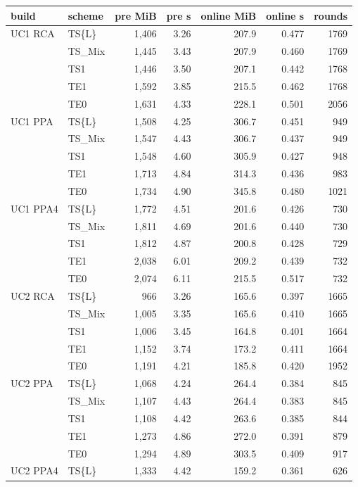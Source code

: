\begin{table}[t]
\centering\small
\begin{tabular}{@{}llrrrrr@{}}
\toprule
build & scheme & pre MiB & pre s & online MiB & online s & rounds\\
\midrule
UC1 RCA & TS\{L\} & 1{,}406 & 3.26 & 207.9 & 0.477 & 1769\\
 & TS\_Mix & 1{,}445 & 3.43 & 207.9 & 0.460 & 1769\\
 & TS1 & 1{,}446 & 3.50 & 207.1 & 0.442 & 1768\\
 & TE1 & 1{,}592 & 3.85 & 215.5 & 0.462 & 1768\\
 & TE0 & 1{,}631 & 4.33 & 228.1 & 0.501 & 2056\\
UC1 PPA & TS\{L\} & 1{,}508 & 4.25 & 306.7 & 0.451 & 949\\
 & TS\_Mix & 1{,}547 & 4.43 & 306.7 & 0.437 & 949\\
 & TS1 & 1{,}548 & 4.60 & 305.9 & 0.427 & 948\\
 & TE1 & 1{,}713 & 4.84 & 314.3 & 0.436 & 983\\
 & TE0 & 1{,}734 & 4.90 & 345.8 & 0.480 & 1021\\
UC1 PPA4 & TS\{L\} & 1{,}772 & 4.51 & 201.6 & 0.426 & 730\\
 & TS\_Mix & 1{,}811 & 4.69 & 201.6 & 0.440 & 730\\
 & TS1 & 1{,}812 & 4.87 & 200.8 & 0.428 & 729\\
 & TE1 & 2{,}038 & 6.01 & 209.2 & 0.439 & 732\\
 & TE0 & 2{,}074 & 6.11 & 215.5 & 0.517 & 732\\
\addlinespace
UC2 RCA & TS\{L\} & 966 & 3.26 & 165.6 & 0.397 & 1665\\
 & TS\_Mix & 1{,}005 & 3.35 & 165.6 & 0.410 & 1665\\
 & TS1 & 1{,}006 & 3.45 & 164.8 & 0.401 & 1664\\
 & TE1 & 1{,}152 & 3.74 & 173.2 & 0.411 & 1664\\
 & TE0 & 1{,}191 & 4.21 & 185.8 & 0.420 & 1952\\
UC2 PPA & TS\{L\} & 1{,}068 & 4.24 & 264.4 & 0.384 & 845\\
 & TS\_Mix & 1{,}107 & 4.43 & 264.4 & 0.383 & 845\\
 & TS1 & 1{,}108 & 4.42 & 263.6 & 0.385 & 844\\
 & TE1 & 1{,}273 & 4.86 & 272.0 & 0.391 & 879\\
 & TE0 & 1{,}294 & 4.89 & 303.5 & 0.409 & 917\\
UC2 PPA4 & TS\{L\} & 1{,}333 & 4.42 & 159.2 & 0.361 & 626\\

\end{tabular}
\end{table}

